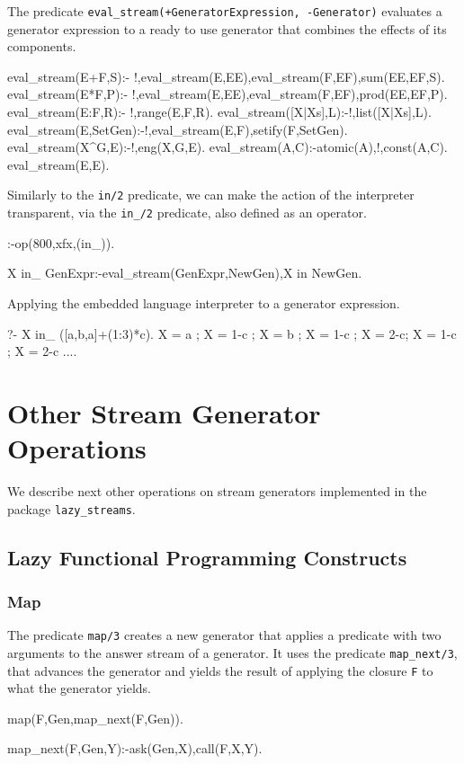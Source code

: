 \documentclass{new_tlp}
\begin{document}
The predicate  {\tt eval\_stream(+GeneratorExpression, -Generator)}
evaluates a generator expression to a ready to use generator that combines 
the effects of its components.
\begin{code}
eval_stream(E+F,S):- !,eval_stream(E,EE),eval_stream(F,EF),sum(EE,EF,S).
eval_stream(E*F,P):- !,eval_stream(E,EE),eval_stream(F,EF),prod(EE,EF,P).
eval_stream(E:F,R):- !,range(E,F,R).
eval_stream([X|Xs],L):-!,list([X|Xs],L).
eval_stream({E},SetGen):-!,eval_stream(E,F),setify(F,SetGen).
eval_stream(X^G,E):-!,eng(X,G,E).
eval_stream(A,C):-atomic(A),!,const(A,C).
eval_stream(E,E).
\end{code}
Similarly to the {\tt in/2} predicate, we can make the action of the
interpreter transparent, via the {\tt in\_/2} predicate, also defined as an operator.
\begin{code}
:-op(800,xfx,(in_)).

X in_ GenExpr:-eval_stream(GenExpr,NewGen),X in NewGen.     
\end{code}

\BX
Applying the embedded language interpreter to a generator expression.
\begin{codex}
?- X in_ ({[a,b,a]}+(1:3)*c).
X = a ; X = 1-c ; X = b ; X = 1-c ; X = 2-c; X = 1-c ; X = 2-c ....
\end{codex}
\EX



\section{Other Stream Generator Operations}\label{other}
We describe next other operations on stream generators
implemented in the package {\tt lazy\_streams}.

\subsection{Lazy Functional Programming Constructs}

\subsubsection{Map}

The predicate {\tt map/3} creates a new generator that
applies a predicate with two arguments to the answer stream  of a generator.
It uses the predicate {\tt map\_next/3}, that advances the generator
and yields the result of applying the closure {\tt F} to what
the generator yields.
\begin{code}
map(F,Gen,map_next(F,Gen)).

map_next(F,Gen,Y):-ask(Gen,X),call(F,X,Y).
\end{code}
\end{document}
